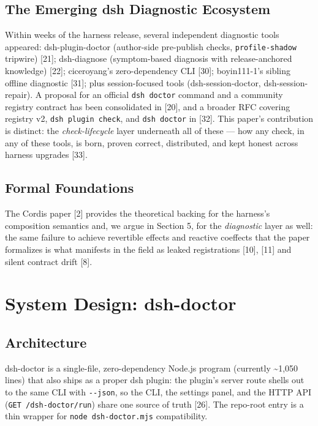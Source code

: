 \documentclass[11pt]{article}
\begin{document}
\subsection{The Emerging dsh Diagnostic
Ecosystem}\label{the-emerging-dsh-diagnostic-ecosystem}

Within weeks of the harness release, several independent diagnostic
tools appeared: dsh-plugin-doctor (author-side pre-publish checks,
\texttt{profile-shadow} tripwire) [21]; dsh-diagnose (symptom-based
diagnosis with release-anchored knowledge) [22]; ciceroyang's
zero-dependency CLI [30]; boyin111-1's sibling offline diagnostic
[31]; plus session-focused tools (dsh-session-doctor,
dsh-session-repair). A proposal for an official \texttt{dsh\ doctor}
command and a community registry contract has been consolidated in
[20], and a broader RFC covering registry v2,
\texttt{dsh\ plugin\ check}, and \texttt{dsh\ doctor} in [32]. This
paper's contribution is distinct: the \emph{check-lifecycle} layer
underneath all of these --- how any check, in any of these tools, is
born, proven correct, distributed, and kept honest across harness
upgrades [33].

\subsection{Formal Foundations}\label{formal-foundations}

The Cordis paper [2] provides the theoretical backing for the
harness's composition semantics and, we argue in Section 5, for the
\emph{diagnostic} layer as well: the same failure to achieve revertible
effects and reactive coeffects that the paper formalizes is what
manifests in the field as leaked registrations [10], [11] and
silent contract drift [8].

\section{System Design:
dsh-doctor}\label{system-design-dsh-doctor}

\subsection{Architecture}\label{architecture}

dsh-doctor is a single-file, zero-dependency Node.js program (currently
\textasciitilde1,050 lines) that also ships as a proper dsh plugin: the
plugin's server route shells out to the same CLI with \texttt{-\/-json},
so the CLI, the settings panel, and the HTTP API
(\texttt{GET\ /dsh-doctor/run}) share one source of truth [26]. The
repo-root entry is a thin wrapper for \texttt{node\ dsh-doctor.mjs}
compatibility.
\end{document}
